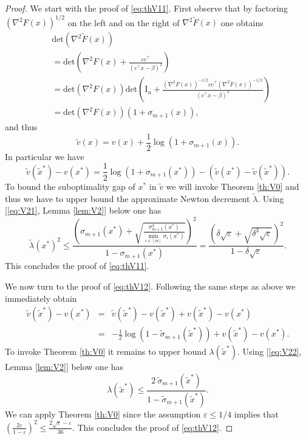 \documentclass[openany]{now}
\renewcommand{\epsilon}{\varepsilon}
\renewcommand{\tilde}{\widetilde}
\begin{document}
\begin{proof}
We start with the proof of \eqref{eq:thV11}. First observe that by factoring $(\nabla^2 F(x))^{1/2}$ on the left and on the right of $\nabla^2 \tilde{F}(x)$ one obtains
\begin{align*}
& \mathrm{det}(\nabla^2 \tilde{F}(x)) \\
& = \mathrm{det}\left(\nabla^2 {F}(x) + \frac{cc^{\top}}{(c^{\top} x- \beta)^2} \right) \\
& = \mathrm{det}(\nabla^2 {F}(x)) \mathrm{det}\left(\mathrm{I}_n + \frac{(\nabla^2 {F}(x))^{-1/2} c c^{\top} (\nabla^2 {F}(x))^{-1/2}}{(c^{\top} x- \beta)^2}\right) \\
& = \mathrm{det}(\nabla^2 {F}(x)) (1+\sigma_{m+1}(x)) ,
\end{align*}
and thus
$$\tilde{v}(x) = v(x) + \frac{1}{2} \log(1+ \sigma_{m+1}(x)) .$$
In particular we have
$$\tilde{v}(\tilde{x}^*) - v(x^*) = \frac{1}{2} \log(1+ \sigma_{m+1}(x^*)) - (\tilde{v}(x^*) - \tilde{v}(\tilde{x}^*)) .$$
To bound the suboptimality gap of $x^*$ in $\tilde{v}$ we will invoke Theorem \ref{th:V0} and thus we have to upper bound the approximate Newton decrement $\tilde{\lambda}$.
Using [\eqref{eq:V21}, Lemma \ref{lem:V2}] below one has 
$$\tilde{\lambda} (x^*)^2 \leq \frac{\left(\sigma_{m+1}(x^*) + \sqrt{\frac{\sigma_{m+1}^3(x^*)}{\min_{i \in [m]} \sigma_i(x^*)}}\right)^2}{1-\sigma_{m+1}(x^*)} = \frac{\left(\delta \sqrt{\epsilon} + \sqrt{\delta^{3} \sqrt{\epsilon}}\right)^2}{1- \delta \sqrt{\epsilon}}  .$$
This concludes the proof of \eqref{eq:thV11}.
\newline

We now turn to the proof of \eqref{eq:thV12}. Following the same steps as above we immediately obtain
\begin{eqnarray*}
\tilde{v}(\tilde{x}^*) - v(x^*) & = & \tilde{v}(\tilde{x}^*) - v(\tilde{x}^*)+v(\tilde{x}^*)- v(x^*)  \\
& = & - \frac{1}{2} \log(1 - \tilde{\sigma}_{m+1}(\tilde{x}^*)) + v(\tilde{x}^*)- v(x^*).
\end{eqnarray*}
To invoke Theorem \ref{th:V0} it remains to upper bound $\lambda(\tilde{x}^*)$. Using [\eqref{eq:V22}, Lemma \ref{lem:V2}] below one has
$$ \lambda(\tilde{x}^*) \leq \frac{2 \ \tilde{\sigma}_{m+1}(\tilde{x}^*)}{1 - \tilde{\sigma}_{m+1}(\tilde{x}^*)} .$$
We can apply Theorem \ref{th:V0} since the assumption $\epsilon \leq 1/4$ implies that $\left(\frac{2 \epsilon}{1-\epsilon}\right)^2 \leq \frac{2 \sqrt{\epsilon} - \epsilon}{36}$. This concludes the proof of \eqref{eq:thV12}.
\end{proof}
\end{document}
